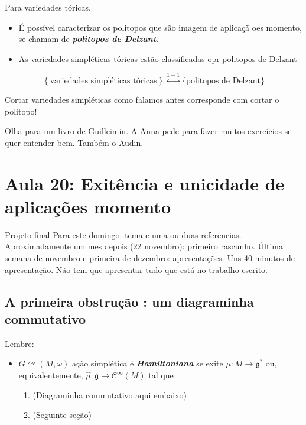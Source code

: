 Para variedades tóricas,
\begin{itemize}
\item É possível caracterizar os politopos que são imagem de aplicaçã oes momento, se chamam de \textit{\textbf{politopos de Delzant}}.
 \item As variedades simpléticas tóricas estão classificadas opr politopos de Delzant
\end{itemize}

\begin{thm}[Delzant]\leavevmode
	\[\left\{ \text{variedades simpléticas tóricas}  \right\} \overset{1-1}{\longleftrightarrow} \{\text{politopos de Delzant} \}\]
\end{thm}

\begin{remark}\leavevmode
	Cortar variedades simpléticas como falamos antes corresponde com cortar o politopo!
\end{remark}

\begin{remark}\leavevmode
	Olha para um livro de Guilleimin. A Anna pede para fazer muitos exercícios se quer  entender bem. Também o Audin.
\end{remark}

\section{Aula 20: Exitência e unicidade de aplicações momento}

\begin{thing8}{Projeto final}\leavevmode
	Para este domingo: tema e uma ou duas referencias. Aproximadamente um mes depois (22 novembro): primeiro rascunho. Última semana de novembro e primeira de dezembro: apresentações. Uns 40 minutos de apresentação. Não tem que apresentar tudo que está no trabalho escrito.

	

\end{thing8}

\subsection{A primeira obstrução : um diagraminha commutativo}

Lembre:
\begin{itemize}
\item $G\curvearrowright(M,\omega)$ ação simplética é \textit{\textbf{Hamiltoniana}} se exite  $\mu:M\to \mathfrak{g}^*$ ou, equivalentemente, $\hat{\mu}:\mathfrak{g} \to \mathcal{C}^\infty(M)$ tal que
	\begin{enumerate}
		\item (Diagraminha commutativo aqui embaixo)
	
		\item (Seguinte seção)
	\end{enumerate}
\end{itemize}

